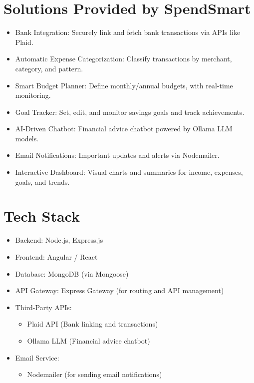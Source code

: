 \documentclass{article}
\begin{document}
\section{Solutions Provided by SpendSmart}
\begin{itemize}
    \item Bank Integration: Securely link and fetch bank transactions via APIs like Plaid.
    \item Automatic Expense Categorization: Classify transactions by merchant, category, and pattern.
    \item Smart Budget Planner: Define monthly/annual budgets, with real-time monitoring.
    \item Goal Tracker: Set, edit, and monitor savings goals and track achievements.
    \item AI-Driven Chatbot: Financial advice chatbot powered by Ollama LLM models.
    \item Email Notifications: Important updates and alerts via Nodemailer.
    \item Interactive Dashboard: Visual charts and summaries for income, expenses, goals, and trends.
\end{itemize}

\section{Tech Stack}
\begin{itemize}
    \item Backend: Node.js, Express.js
    \item Frontend: Angular / React
    \item Database: MongoDB (via Mongoose)
    \item API Gateway: Express Gateway (for routing and API management)
    \item Third-Party APIs:
    \begin{itemize}
        \item Plaid API (Bank linking and transactions)
        \item Ollama LLM (Financial advice chatbot)
    \end{itemize}
    \item Email Service:
    \begin{itemize}
        \item Nodemailer (for sending email notifications)
    \end{itemize}
\end{itemize}
\end{document}
